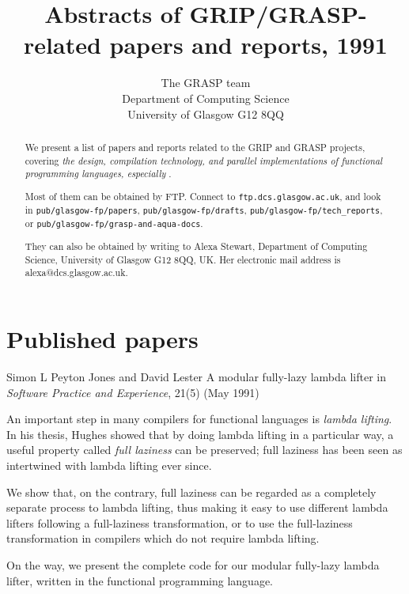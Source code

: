 


\title{Abstracts of GRIP/GRASP-related papers and reports, 1991
}

\author{The GRASP team \\ Department of Computing Science \\
University of Glasgow G12 8QQ
}

\maketitle

\begin{abstract}
We present a list of papers and reports related to the GRIP 
and GRASP projects,
covering {\em the design, compilation technology,
and parallel implementations of functional programming languages, especially
\Haskell{}}.

Most of them can be obtained by FTP.  Connect to {\tt ftp.dcs.glasgow.ac.uk},
and look in {\tt pub/glasgow-fp/papers}, {\tt pub/glasgow-fp/drafts}, {\tt pub/glasgow-fp/tech\_reports},
or {\tt pub/glasgow-fp/grasp-and-aqua-docs}.

They can also be obtained by writing to 
Alexa Stewart, Department of Computing Science,
University of Glasgow G12 8QQ, UK.   Her electronic mail address is
alexa@dcs.glasgow.ac.uk.
\end{abstract}

\section{Published papers}

{Simon L Peyton Jones and David Lester}
{A modular fully-lazy lambda lifter in \Haskell{}}
{{\em Software Practice and Experience}, 21(5) (May 1991)}
{An important step in many compilers for functional languages is
{\em lambda lifting}.  In his thesis, Hughes showed that by doing lambda
lifting in a particular way, a useful property called {\em full laziness}
can be preserved;
full laziness has been seen as intertwined with
lambda lifting ever since.  

We show that, on the contrary, full laziness can be regarded as a completely
separate process to lambda lifting, thus making it easy to use different
lambda lifters following a full-laziness transformation, or to use
the full-laziness transformation in compilers which do not require lambda
lifting.

On the way, we present the complete code for our modular fully-lazy
lambda lifter, written in the \Haskell{} functional programming language.
}

